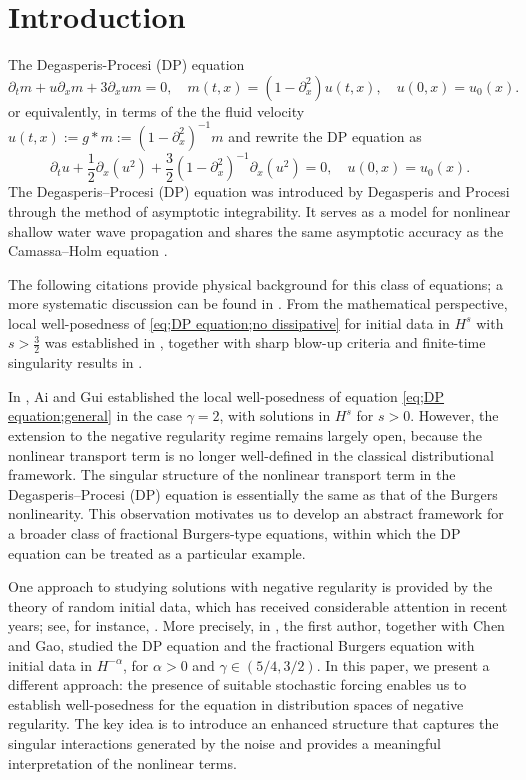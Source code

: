 \documentclass{article}
\numberwithin{equation}{section}
\newcommand{\p}{\partial}
\begin{document}
\section{Introduction}
The Degasperis-Procesi (DP) equation 
\begin{equation}\label{eq;DP equation;no dissipative}
		\p_tm+u\p_xm+3\p_xum=0,\quad m(t,x)=(1-\partial_x^2)u(t,x),\quad u(0,x)=u_0(x).
	\end{equation}
or equivalently, in terms of the the fluid velocity $u(t,x):=g\ast m:=(1-\p_x^2)^{-1}m$ and rewrite the DP equation as
	\begin{equation}\label{eq;DP equation;general}
		\p_tu+\frac{1}{2}\p_x(u^2)+\frac{3}{2}(1-\partial_x^2)^{-1}\partial_x(u^2)=0,\quad u(0,x)=u_0(x).
	\end{equation}
   The Degasperis--Procesi (DP) equation was introduced by Degasperis and Procesi 
\cite{degasperis1999asymptotic,degasperis2002new}  through the method of asymptotic integrability. It serves as a model for nonlinear shallow water wave propagation and 
shares the same asymptotic accuracy as the Camassa--Holm equation \cite{CAMASSA19941}. 
 	 \par The following citations \cite{degasperis1999asymptotic,degasperis2002new} provide physical background for this class of equations; a more systematic discussion can be found in \cite{ai2010global}. From the mathematical perspective,  local well-posedness of \eqref{eq;DP equation;no dissipative} for initial data in $H^s$ with $s>\frac{3}{2}$ was established in \cite{liu2006global}, together with sharp blow-up criteria and finite-time singularity results in \cite{liu2007blow}.
\par In \cite{ai2010global}, Ai and Gui established the local well-posedness of equation \eqref{eq;DP equation;general} in the case $\gamma=2$, with solutions in $H^s$ for $s>0$. However, the extension to the negative regularity regime remains largely open, because the nonlinear transport term is no longer well-defined in the classical distributional framework.
The singular structure of the nonlinear transport term in the Degasperis--Procesi (DP) equation is essentially the same as that of the Burgers nonlinearity. This observation motivates us to develop an abstract framework for a broader class of fractional Burgers-type equations, within which the DP equation can be treated as a particular example.
\par One approach to studying solutions with negative regularity is provided by the theory of random initial data, which has received considerable attention in recent years; see, for instance, \cite{burqRandomDataCauchy2008a,burqRandomDataCauchy2008c,deng2022random,deng2024probabilistic,deng2024invariant}. More precisely, in \cite{chen2024probabilistic}, the first author, together with Chen and Gao, studied the DP equation and the fractional Burgers equation with initial data in \(H^{-\alpha}\), for \(\alpha>0\) and \(\gamma\in(5/4,3/2)\). In this paper, we present a different approach: the presence of suitable stochastic forcing enables us to establish well-posedness for the equation in distribution spaces of negative regularity. The key idea is to introduce an enhanced structure that captures the singular interactions generated by the noise and provides a meaningful interpretation of the nonlinear terms.
\end{document}
